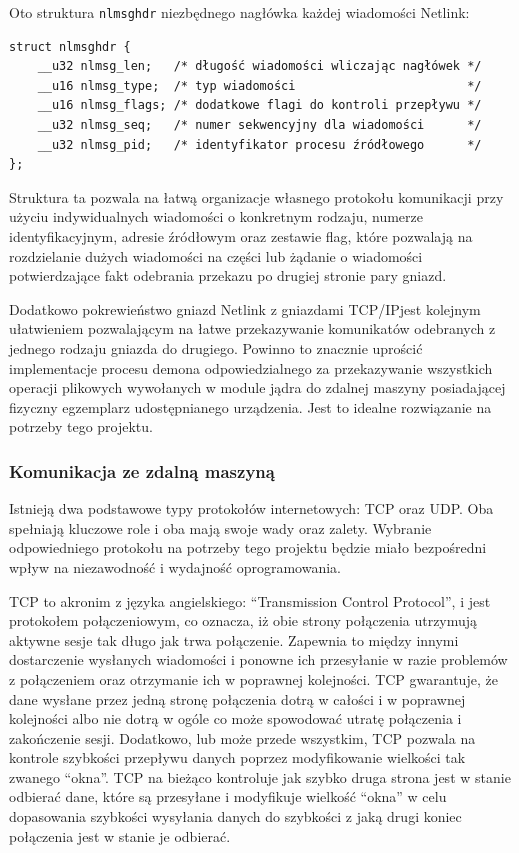 \documentclass[11pt]{scrartcl}
\begin{document}
Oto struktura \texttt{nlmsghdr} niezbędnego nagłówka każdej wiadomości Netlink:

\begin{verbatim}
struct nlmsghdr {
    __u32 nlmsg_len;   /* długość wiadomości wliczając nagłówek */
    __u16 nlmsg_type;  /* typ wiadomości                        */
    __u16 nlmsg_flags; /* dodatkowe flagi do kontroli przepływu */
    __u32 nlmsg_seq;   /* numer sekwencyjny dla wiadomości      */
    __u32 nlmsg_pid;   /* identyfikator procesu źródłowego      */
};
\end{verbatim}

Struktura ta pozwala na łatwą organizacje własnego protokołu komunikacji przy użyciu indywidualnych wiadomości o konkretnym rodzaju, numerze identyfikacyjnym, adresie źródłowym oraz zestawie flag, które pozwalają na rozdzielanie dużych wiadomości na części lub żądanie o wiadomości potwierdzające fakt odebrania przekazu po drugiej stronie pary gniazd.

Dodatkowo pokrewieństwo gniazd Netlink z gniazdami TCP/IP\@ jest kolejnym ułatwieniem pozwalającym na łatwe przekazywanie komunikatów odebranych z jednego rodzaju gniazda do drugiego. Powinno to znacznie uprościć implementacje procesu demona odpowiedzialnego za przekazywanie wszystkich operacji plikowych wywołanych w module jądra do zdalnej maszyny posiadającej fizyczny egzemplarz udostępnianego urządzenia. Jest to idealne rozwiązanie na potrzeby tego projektu.

\subsubsection{Komunikacja ze zdalną maszyną}

Istnieją dwa podstawowe typy protokołów internetowych: TCP oraz UDP\@. Oba spełniają kluczowe role i oba mają swoje wady oraz zalety. Wybranie odpowiedniego protokołu na potrzeby tego projektu będzie miało bezpośredni wpływ na niezawodność i wydajność oprogramowania.

TCP to akronim z języka angielskiego: ``Transmission Control Protocol'', i jest protokołem połączeniowym, co oznacza, iż obie strony połączenia utrzymują aktywne sesje tak długo jak trwa połączenie. Zapewnia to między innymi dostarczenie wysłanych wiadomości i ponowne ich przesyłanie w razie problemów z połączeniem oraz otrzymanie ich w poprawnej kolejności. TCP gwarantuje, że dane wysłane przez jedną stronę połączenia dotrą w całości i w poprawnej kolejności albo nie dotrą w ogóle co może spowodować utratę połączenia i zakończenie sesji. Dodatkowo, lub może przede wszystkim, TCP pozwala na kontrole szybkości przepływu danych poprzez modyfikowanie wielkości tak zwanego ``okna''. TCP na bieżąco kontroluje jak szybko druga strona jest w stanie odbierać dane, które są przesyłane i modyfikuje wielkość ``okna'' w celu dopasowania szybkości wysyłania danych do szybkości z jaką drugi koniec połączenia jest w stanie je odbierać.
\end{document}
